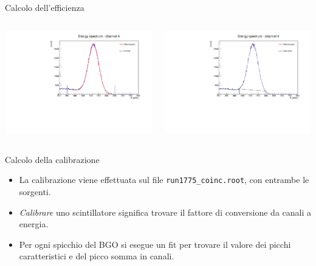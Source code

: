 \documentclass [xcolor=svgnames] {beamer}
\begin{document}
\begin{frame}{Calcolo dell'efficienza}
	\begin{columns}
		\begin{column}{0.5\textwidth}
			\includegraphics[width=\textwidth]{img/parameter.pdf}
		\end{column}
		\begin{column}{0.5\textwidth}
			\includegraphics[width=\textwidth]{img/trapezoid.pdf}
		\end{column}
	\end{columns}
\end{frame}

\begin{frame}{Calcolo della calibrazione}
	\begin{itemize}
		\item La calibrazione viene effettuata sul file \texttt{run1775\_coinc.root}, con entrambe le sorgenti.
		\item \emph{Calibrare} uno scintillatore significa trovare il fattore di conversione da canali a energia.
		\item Per ogni spicchio del BGO si esegue un fit per trovare il valore dei picchi caratteristici e del picco somma in canali.
	\end{itemize}
\end{frame}
\end{document}
